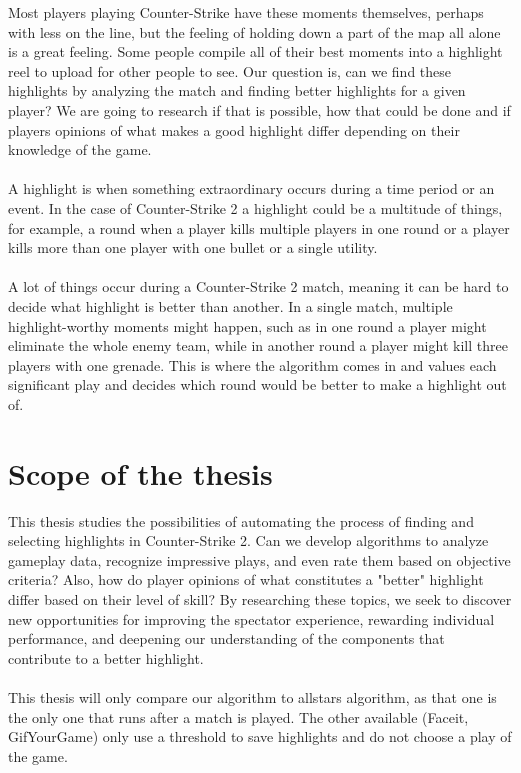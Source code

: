 Most players playing Counter-Strike have these moments themselves, perhaps with less on the line, but the feeling of holding down a part of the map all alone is a great feeling. Some people compile all of their best moments into a highlight reel to upload for other people to see. Our question is, can we find these highlights by analyzing the match and finding better highlights for a given player? We are going to research if that is possible, how that could be done and if players opinions of what makes a good highlight differ depending on their knowledge of the game.\\\\
A highlight is when something extraordinary occurs during a time period or an event. In the case of Counter-Strike 2 a highlight could be a multitude of things, for example, a \gls{round} when a player kills multiple players in one round or a player kills more than one player with one bullet or a single \gls{utility}. \\\\
A lot of things occur during a Counter-Strike 2 match, meaning it can be hard to decide what highlight is better than another. In a single match, multiple highlight-worthy moments might happen, such as in one round a player might eliminate the whole enemy team, while in another round a player might kill three players with one grenade. This is where the algorithm comes in and values each significant play and decides which round would be better to make a highlight out of.


\section{Scope of the thesis}
This thesis studies the possibilities of automating the process of finding and selecting highlights in Counter-Strike 2.  Can we develop algorithms to analyze gameplay data, recognize impressive plays, and even rate them based on objective criteria?  Also, how do player opinions of what constitutes a "better" highlight differ based on their level of skill?  By researching these topics, we seek to discover new opportunities for improving the spectator experience, rewarding individual performance, and deepening our understanding of the components that contribute to a better highlight. 
\\\\
This thesis will only compare our algorithm to \gls{allstar}s algorithm, as that one is the only one that runs after a match is played. The other available (Faceit, GifYourGame) only use a threshold to save highlights and do not choose a play of the game.
